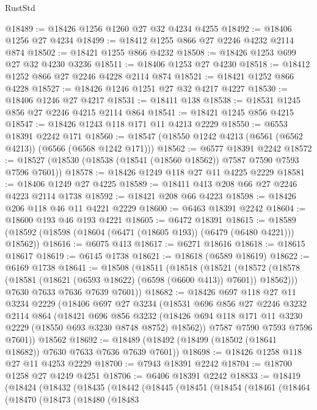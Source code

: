 \begin{lexlean}{RustStd}
\begin{coremodule}
@18489 := @18426 @1256 @1260 @27 @32 @4234 @4255
@18492 := @18406 @1256 @27 @4234
@18499 := @18412 @1255 @866 @27 @2246 @4232 @2114 @874
@18502 := @18421 @1255 @866 @4232
@18508 := @18426 @1253 @699 @27 @32 @4230 @3236
@18511 := @18406 @1253 @27 @4230
@18518 := @18412 @1252 @866 @27 @2246 @4228 @2114 @874
@18521 := @18421 @1252 @866 @4228
@18527 := @18426 @1246 @1251 @27 @32 @4217 @4227
@18530 := @18406 @1246 @27 @4217
@18531 := @18411 @138
@18538 := @18531 @1245 @856 @27 @2246 @4215 @2114 @864
@18541 := @18421 @1245 @856 @4215
@18547 := @18426 @1243 @118 @171 @11 @4213 @2229
@18550 := @6553 @18391 @2242 @171
@18560 := @18547 (@18550 @1242 @4213 (@6561 (@6562 @4213)) (@6566 (@6568 @1242 @171)))
@18562 := @6577 @18391 @2242
@18572 := @18527 (@18530 (@18538 (@18541 (@18560 @18562)) @7587 @7590 @7593 @7596 @7601))
@18578 := @18426 @1249 @118 @27 @11 @4225 @2229
@18581 := @18406 @1249 @27 @4225
@18589 := @18411 @413 @208 @66 @27 @2246 @4223 @2114 @1738
@18592 := @18421 @208 @66 @4223
@18598 := @18426 @206 @118 @46 @11 @4221 @2229
@18600 := @6463 @18391 @2242
@18604 := @18600 @193 @46 @193 @4221
@18605 := @6472 @18391
@18615 := @18589 (@18592 (@18598 (@18604 (@6471 (@18605 @193)) (@6479 (@6480 @4221))) @18562))
@18616 := @6075 @413
@18617 := @6271 @18616
@18618 := @18615 @18617
@18619 := @6145 @1738
@18621 := @18618 (@6589 @18619)
@18622 := @6169 @1738
@18641 := @18508
    (@18511
      (@18518
        (@18521
          (@18572 (@18578 (@18581 (@18621 (@6593 @18622) (@6598 (@6600 @413)) @7601)) @18562)))
        @7630
        @7633
        @7636
        @7639
        @7601))
@18682 := @18426
    @697
    @118
    @27
    @11
    @3234
    @2229
    (@18406
      @697
      @27
      @3234
      (@18531
        @696
        @856
        @27
        @2246
        @3232
        @2114
        @864
        (@18421
          @696
          @856
          @3232
          (@18426 @694 @118 @171 @11 @3230 @2229 (@18550 @693 @3230 @8748 @8752) @18562))
        @7587
        @7590
        @7593
        @7596
        @7601))
    @18562
@18692 := @18489 (@18492 (@18499 (@18502 (@18641 @18682)) @7630 @7633 @7636 @7639 @7601))
@18698 := @18426 @1258 @118 @27 @11 @4253 @2229
@18700 := @7943 @18391 @2242
@18704 := @18700 @1258 @27 @4249 @4251
@18706 := @6406 @18391 @2242
@18833 := @18419
    (@18424
      (@18432
        (@18435
          (@18442
            (@18445
              (@18451
                (@18454
                  (@18461
                    (@18464
                      (@18470
                        (@18473
                          (@18480
                            (@18483

\end{coremodule}
\end{lexlean}
